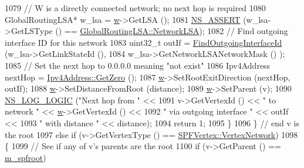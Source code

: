 \begin{DoxyCode}
1079 \textcolor{comment}{// W is a directly connected network; no next hop is required}
1080           GlobalRoutingLSA* w\_lsa = \hyperlink{lte_2model_2fading-traces_2fading__trace__generator_8m_afd61ec66f9d7b807eece6eb12c781844}{w}->GetLSA ();
1081           \hyperlink{assert_8h_a6dccdb0de9b252f60088ce281c49d052}{NS\_ASSERT} (w\_lsa->GetLSType () == 
      \hyperlink{classns3_1_1GlobalRoutingLSA_a34eb53a1ed37c877923b74d671224fdeab37398976cdc8ddd08e1428a4700b5b4}{GlobalRoutingLSA::NetworkLSA});
1082 \textcolor{comment}{// Find outgoing interface ID for this network}
1083           uint32\_t outIf = \hyperlink{classns3_1_1GlobalRouteManagerImpl_a55b3c7bf042d95de52cf56cc6699dc9a}{FindOutgoingInterfaceId} (w\_lsa->GetLinkStateId (), 
1084                                                     w\_lsa->GetNetworkLSANetworkMask () );
1085 \textcolor{comment}{// Set the next hop to 0.0.0.0 meaning "not exist"}
1086           Ipv4Address nextHop = \hyperlink{classns3_1_1Ipv4Address_aeeb1c76b35d4ab612fda7bc51e99c5db}{Ipv4Address::GetZero} ();
1087           \hyperlink{lte_2model_2fading-traces_2fading__trace__generator_8m_afd61ec66f9d7b807eece6eb12c781844}{w}->SetRootExitDirection (nextHop, outIf);
1088           \hyperlink{lte_2model_2fading-traces_2fading__trace__generator_8m_afd61ec66f9d7b807eece6eb12c781844}{w}->SetDistanceFromRoot (distance);
1089           \hyperlink{lte_2model_2fading-traces_2fading__trace__generator_8m_afd61ec66f9d7b807eece6eb12c781844}{w}->SetParent (v);
1090           \hyperlink{group__logging_ga88acd260151caf2db9c0fc84997f45ce}{NS\_LOG\_LOGIC} (\textcolor{stringliteral}{"Next hop from "} << 
1091                         v->GetVertexId () << \textcolor{stringliteral}{" to network "} << \hyperlink{lte_2model_2fading-traces_2fading__trace__generator_8m_afd61ec66f9d7b807eece6eb12c781844}{w}->GetVertexId () <<
1092                         \textcolor{stringliteral}{" via outgoing interface "} << outIf <<
1093                         \textcolor{stringliteral}{" with distance "} << distance);
1094           \textcolor{keywordflow}{return} 1;
1095         \}
1096     \} \textcolor{comment}{// end v is the root}
1097   \textcolor{keywordflow}{else} \textcolor{keywordflow}{if} (v->GetVertexType () == \hyperlink{classns3_1_1SPFVertex_a20f8a4cfc99a1b7ecd10a23151b93afda00415acb788d8d95bee545fe2046c2a8}{SPFVertex::VertexNetwork}) 
1098     \{
1099 \textcolor{comment}{// See if any of v's parents are the root}
1100       \textcolor{keywordflow}{if} (v->GetParent () == \hyperlink{classns3_1_1GlobalRouteManagerImpl_a977f6b62ef1f1b58d041a2f49c093a1c}{m\_spfroot})

\end{DoxyCode}
